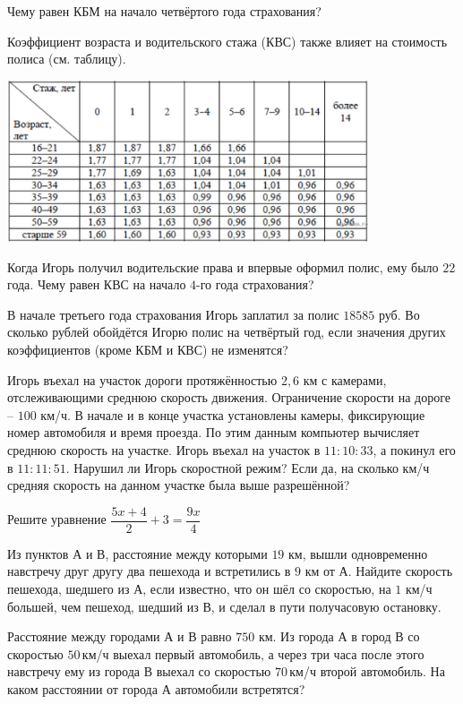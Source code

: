 \begin{homework}[number=2]
\begin{listofex}
		\item Чему равен КБМ на начало четвёртого года страхования?
		\item Коэффициент возраста и водительского стажа (КВС) также влияет на стоимость полиса (см. таблицу).
		\begin{center}
			\includegraphics[align=t, width=0.8\textwidth]{pics/G91M3H2-2}
		\end{center}
		Когда Игорь получил водительские права и впервые оформил полис, ему было \( 22 \) года. Чему равен КВС на начало \( 4 \)-го года страхования?
		\item В начале третьего года страхования Игорь заплатил за полис \( 18 585 \) руб. Во сколько рублей обойдётся Игорю полис на четвёртый год, если значения других коэффициентов (кроме КБМ и КВС) не изменятся?	
		\item Игорь въехал на участок дороги протяжённостью \( 2,6 \) км с камерами, отслеживающими среднюю скорость движения. Ограничение скорости на дороге -- \( 100  \) км/ч. В начале и в конце участка установлены камеры, фиксирующие номер автомобиля и время проезда. По этим данным компьютер вычисляет среднюю скорость на участке. Игорь въехал на участок в \( 11:10:33 \), а покинул его в \( 11:11:51 \). Нарушил ли Игорь скоростной режим? Если да, на сколько км/ч средняя скорость на данном участке была выше разрешённой?
		\item Решите уравнение \( \dfrac{5x+4}{2}+3=\dfrac{9x}{4} \)
		\item Из пунктов \( А \) и \( В \), расстояние между которыми \( 19  \) км, вышли одновременно навстречу друг другу два пешехода и встретились в \( 9  \) км от \( А \). Найдите скорость пешехода, шедшего из \( А \), если известно, что он шёл со скоростью, на \( 1  \) км/ч большей, чем пешеход, шедший из \( В \), и сделал в пути получасовую остановку.
		\item Расстояние между городами \( А  \) и \( В  \) равно \( 750  \) км. Из города \( А \) в город \( В \) со скоростью \( 50 \) км/ч выехал первый автомобиль, а через три часа после этого навстречу ему из города В выехал со скоростью \( 70 \) км/ч второй автомобиль. На каком расстоянии от города \( А \) автомобили встретятся?
		\item {}
	\end{listofex}
\end{homework}
